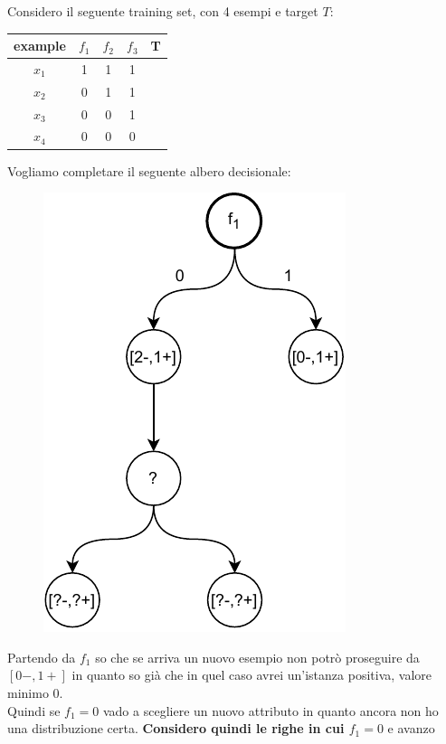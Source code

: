 \begin{esempio}
  Considero il seguente training set, con 4 esempi e target $T$:
  \begin{table}[H]
    \centering
    \begin{tabular}{c|c|c|c|c}
      example & $f_1$ & $f_2$ & $f_3$ & T\\
      \hline
      $x_1$ & 1 & 1 & 1 & \color{darkgreen}{1}\\
      $x_2$ & 0 & 1 & 1 & \color{red}{0}\\
      $x_3$ & 0 & 0 & 1 & \color{darkgreen}{1}\\
      $x_4$ & 0 & 0 & 0 & \color{red}{0}\\
    \end{tabular}
  \end{table}
  Vogliamo completare il seguente albero decisionale:
  \begin{figure}[H]
    \centering
    \includegraphics[scale = 0.75]{img/id5.pdf}
  \end{figure}
  Partendo da $f_1$ so che se arriva un nuovo esempio non potrò proseguire da
  $[0-, 1+]$ in quanto so già che in quel caso avrei un'istanza positiva, valore
  minimo $0$.\\
  Quindi se $f_1=0$ vado a scegliere un nuovo attributo in quanto ancora non ho
  una distribuzione certa.\textbf{ Considero quindi le righe in cui $f_1=0$} e avanzo

\end{esempio}
